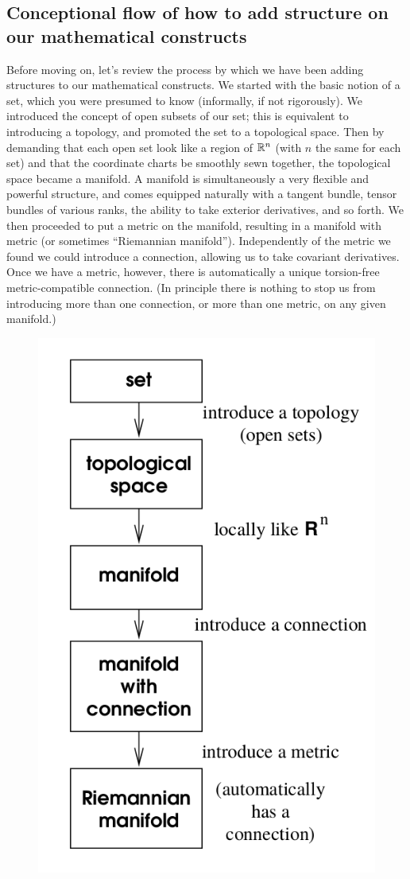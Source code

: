 \subsection{Conceptional flow of how to add structure on our mathematical constructs}
Before moving on, let’s review the process by which we have been adding structures to
our mathematical constructs. We started with the basic notion of a set, which you were
presumed to know (informally, if not rigorously). We introduced the concept of open subsets
of our set; this is equivalent to introducing a topology, and promoted the set to a topological
space. Then by demanding that each open set look like a region of $\mathbb{R}^n$ (with $n$ the same for
each set) and that the coordinate charts be smoothly sewn together, the topological space
became a manifold. A manifold is simultaneously a very flexible and powerful structure,
and comes equipped naturally with a tangent bundle, tensor bundles of various ranks, the
ability to take exterior derivatives, and so forth. We then proceeded to put a metric on
the manifold, resulting in a manifold with metric (or sometimes “Riemannian manifold”).
Independently of the metric we found we could introduce a connection, allowing us to take
covariant derivatives. Once we have a metric, however, there is automatically a unique
torsion-free metric-compatible connection. (In principle there is nothing to stop us from
introducing more than one connection, or more than one metric, on any given manifold.)
\begin{figure}[h!]
	\centering
	\includegraphics[width=0.7\linewidth]{gfx/FlowManifoldStructure}
	\caption{}
	\label{fig:flowmanifoldstructure}
\end{figure}

